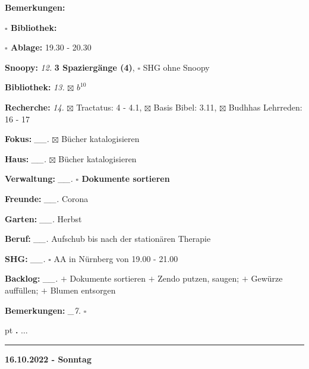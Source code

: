 \documentclass[10pt,a4paper]{article}
\newcounter{notec}
\newcommand\notep[1]{%
  \stepcounter{notec}
  \vskip #1pt
  {\bf\arabic{notec}.}
}
\newcommand\prop[1] {{\color {alizarin} {\bf #1}}}        %
\newcommand\draf[1] {{\color {amber(sae/ece)} {\bf #1}}}  %
\newcommand\mand[1] {{\color {burntorange} {\bf #1}}}     %
\newcommand\ddivide {\vskip -9pt \hrule \vskip 6pt}
\newcommand\bottomspace{\vskip 4pt}
\newcommand\n[1] { {\sl #1.} \hskip 5pt }
\begin{document}
\begin{mdframed}[style=daystyle]
\begin{labeling}{{\mand {Bemerkungen:}}}
\begin{minipage}{0.75\textwidth}
\begin{labeling}{\prop {$\square$ {Bibliothek:}}}
      \item[{\prop {$\square$ Ablage:}}]     19.30 - 20.30
      \end{labeling}
    \end{minipage}
    \bottomspace
  \item[{\mand {Snoopy:}}]         \n{12} {\draf {3 Spaziergänge (4)}}, $\square$ SHG ohne Snoopy
  \item[{\mand {Bibliothek:}}]     \n{13} $\boxtimes$ $b^{10}$
  \item[{\mand {Recherche:}}]      \n{14} $\boxtimes$ Tractatus: 4 - 4.1, $\boxtimes$ Basis Bibel: 3.11,
      $\boxtimes$ Budhhas Lehrreden: 16 - 17
  \item[{\mand {Fokus:}}]        \n{\_\_} $\boxtimes$ Bücher katalogisieren
  \item[{\mand {Haus:}}]         \n{\_\_} $\boxtimes$ Bücher katalogisieren
  \item[{\mand {Verwaltung:}}]   \n{\_\_} {\prop {$\square$ Dokumente sortieren}}
  \item[{\mand {Freunde:}}]      \n{\_\_} Corona
  \item[{\mand {Garten:}}]       \n{\_\_} Herbst
  \item[{\mand {Beruf:}}]        \n{\_\_} Aufschub bis nach der stationären Therapie
  \item[{\mand {SHG:}}]          \n{\_\_} $\square$ AA in Nürnberg von 19.00 - 21.00
  \item[{\mand {Backlog:}}]      \n{\_\_} 
    $+$ Dokumente sortieren
    $+$ Zendo putzen, saugen; $+$ Gewürze auffüllen; $+$ Blumen entsorgen
  \item[{\mand {Bemerkungen:}}]   \n{\_7} {\draf {$\square$}}
  \end{labeling}
    
  \setcounter{notec}{0}
  
  \notep 0 $\ldots$
\end{mdframed}


\ddivide
{\prop {16.10.2022 - Sonntag}}
       
\end{document}
